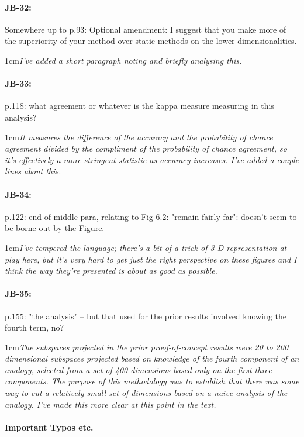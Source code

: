 \documentclass[11pt,a4paper]{article}
\newcommand{\res}[1]{\vspace{0.25cm} \begin{adjustwidth}{1cm}{}\emph{#1}\end{adjustwidth}}
\begin{document}
\paragraph{JB-32:} Somewhere up to p.93: Optional amendment: I suggest that you make more of the superiority of your method over static methods on the lower dimensionalities.

\res{I've added a short paragraph noting and briefly analysing this.}

\paragraph{JB-33:} p.118: what agreement or whatever is the kappa measure measuring in this analysis?

\res{It measures the difference of the accuracy and the probability of chance agreement divided by the compliment of the probability of chance agreement, so it's effectively a more stringent statistic as accuracy increases.  I've added a couple lines about this.}

\paragraph{JB-34:} p.122: end of middle para, relating to Fig 6.2: "remain fairly far": doesn't seem to be borne out by the Figure.

\res{I've tempered the language; there's a bit of a trick of 3-D representation at play here, but it's very hard to get just the right perspective on these figures and I think the way they're presented is about as good as possible.}

\paragraph{JB-35:} p.155: "the analysis" -- but that used for the prior results involved knowing the fourth term, no?

\res{The subspaces projected in the prior proof-of-concept results were 20 to 200 dimensional subspaces projected based on knowledge of the fourth component of an analogy, selected from a set of 400 dimensions based only on the first three components.  The purpose of this methodology was to establish that there was some way to cut a relatively small set of dimensions based on a naive analysis of the analogy.  I've made this more clear at this point in the text.}

\paragraph{Important Typos etc.}
\end{document}
